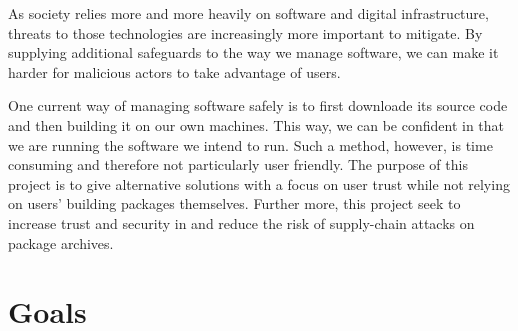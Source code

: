 \documentclass[english, biblatex, digitaloutput]{kththesis}
\begin{document}

As society relies more and more heavily on software and digital infrastructure, threats to those technologies are increasingly more important to mitigate. By supplying additional safeguards to the way we manage software, we can make it harder for malicious actors to take advantage of users.

One current way of managing software safely is to first downloade its source code and then building it on our own machines. This way, we can be confident in that we are running the software we intend to run. Such a method, however, is time consuming and therefore not particularly user friendly. The purpose of this project is to give alternative solutions with a focus on user trust while not relying on users' building packages themselves. Further more, this project seek to increase trust and security in  and reduce the risk of supply-chain attacks on package archives.


\section{Goals}


\end{document}
